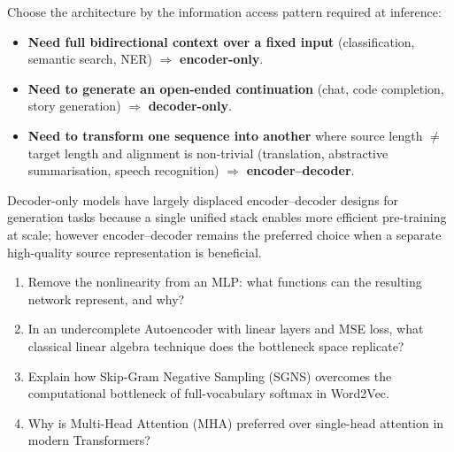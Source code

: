 \documentclass[11pt,a4paper]{article}
\begin{document}
	\begin{keyconcept}
		Choose the architecture by the information access pattern required at inference:
		\begin{itemize}[nosep]
			\item \textbf{Need full bidirectional context over a fixed input} (classification, semantic search, NER) $\Rightarrow$ \textbf{encoder-only}.
			\item \textbf{Need to generate an open-ended continuation} (chat, code completion, story generation) $\Rightarrow$ \textbf{decoder-only}.
			\item \textbf{Need to transform one sequence into another} where source length $\neq$ target length and alignment is non-trivial (translation, abstractive summarisation, speech recognition) $\Rightarrow$ \textbf{encoder--decoder}.
		\end{itemize}
		Decoder-only models have largely displaced encoder--decoder designs for generation tasks because a single unified stack enables more efficient pre-training at scale; however encoder--decoder remains the preferred choice when a separate high-quality source representation is beneficial.
	\end{keyconcept}

	\begin{checkpoint}
		\begin{enumerate}
			\item Remove the nonlinearity from an MLP: what functions can the resulting network represent, and why?
			\item In an undercomplete Autoencoder with linear layers and MSE loss, what classical linear algebra technique does the bottleneck space replicate?
			\item Explain how Skip-Gram Negative Sampling (SGNS) overcomes the computational bottleneck of full-vocabulary softmax in Word2Vec.
			\item Why is Multi-Head Attention (MHA) preferred over single-head attention in modern Transformers?
		\end{enumerate}
	\end{checkpoint}
\end{document}
